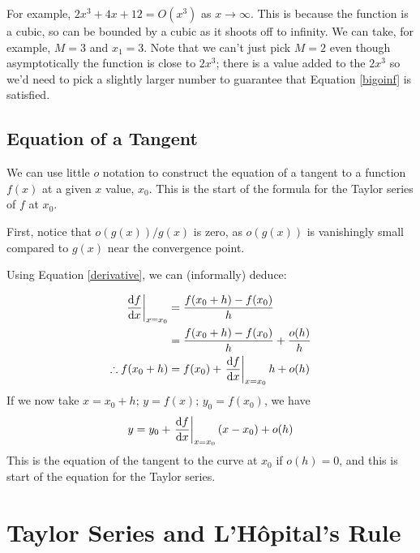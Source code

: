 \documentclass{article}
\begin{document}
For example, $2x^3 + 4x + 12 = O(x^3)$ as $x \to \infty$. This is because the function is a cubic, so can be bounded by a cubic as it shoots off to infinity. We can take, for example, $M = 3$ and $x_1 = 3$. Note that we can't just pick $M=2$ even though asymptotically the function is close to $2x^3$; there is a value added to the $2x^3$ so we'd need to pick a slightly larger number to guarantee that Equation \eqref{bigoinf} is satisfied.

\subsection{Equation of a Tangent}
We can use little $o$ notation to construct the equation of a tangent to a function $f(x)$ at a given $x$ value, $x_0$. This is the start of the formula for the Taylor series of $f$ at $x_0$.

First, notice that $o(g(x))/g(x)$ is zero, as $o(g(x))$ is vanishingly small compared to $g(x)$ near the convergence point.

Using Equation \eqref{derivative}, we can (informally) deduce:

\begin{align*}
	\eval{\frac{\dd{f}}{\dd{x}}}_{x=x_0} & = \frac{f(x_0 + h) - f(x_0)}{h}                          \\
	                                     & = \frac{f(x_0 + h) - f(x_0)}{h} + \frac{o(h)}{h}         \\
	\therefore f(x_0 + h)                & = f(x_0) + \eval{\frac{\dd{f}}{\dd{x}}}_{x=x_0} h + o(h)
\end{align*}
If we now take $x=x_0+h;\,y=f(x);\,y_0=f(x_0)$, we have
\[ y = y_0 + \eval{\frac{\dd{f}}{\dd{x}}}_{x=x_0}(x - x_0) + o(h) \]
This is the equation of the tangent to the curve at $x_0$ if $o(h)=0$, and this is start of the equation for the Taylor series.

\section{Taylor Series and L'H\^opital's Rule}
\end{document}
